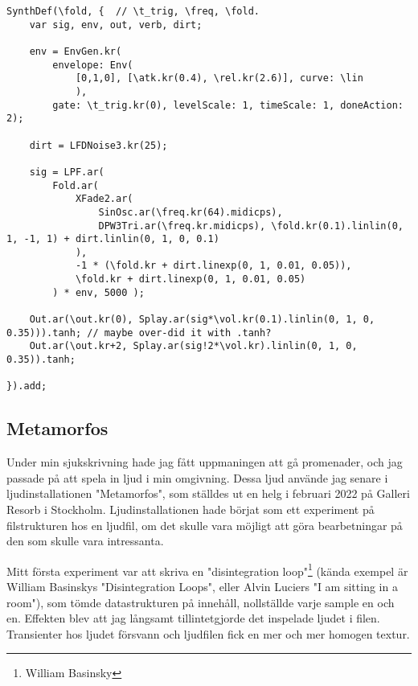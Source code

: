 \documentclass{article}
\renewcommand{\baselinestretch}{1.5}
\begin{document}
\renewcommand{\baselinestretch}{1}
\begin{lstlisting}[style=SuperCollider-IDE, caption=Fold-synt]
SynthDef(\fold, {  // \t_trig, \freq, \fold.
	var sig, env, out, verb, dirt;

	env = EnvGen.kr(
		envelope: Env(
			[0,1,0], [\atk.kr(0.4), \rel.kr(2.6)], curve: \lin
			), 
		gate: \t_trig.kr(0), levelScale: 1, timeScale: 1, doneAction: 2);

	dirt = LFDNoise3.kr(25);

	sig = LPF.ar( 
		Fold.ar(
			XFade2.ar(
				SinOsc.ar(\freq.kr(64).midicps), 
				DPW3Tri.ar(\freq.kr.midicps), \fold.kr(0.1).linlin(0, 1, -1, 1) + dirt.linlin(0, 1, 0, 0.1)
			),
			-1 * (\fold.kr + dirt.linexp(0, 1, 0.01, 0.05)),
			\fold.kr + dirt.linexp(0, 1, 0.01, 0.05)
		) * env, 5000 );

	Out.ar(\out.kr(0), Splay.ar(sig*\vol.kr(0.1).linlin(0, 1, 0, 0.35))).tanh; // maybe over-did it with .tanh?
	Out.ar(\out.kr+2, Splay.ar(sig!2*\vol.kr).linlin(0, 1, 0, 0.35)).tanh;

}).add;
\end{lstlisting}
\renewcommand{\baselinestretch}{1.5}

  \subsection{Metamorfos}
  Under min sjukskrivning hade jag fått uppmaningen att gå promenader, och jag passade på att spela in ljud i
  min omgivning. Dessa ljud använde jag senare i ljudinstallationen "Metamorfos", som ställdes ut en helg i
  februari 2022 på Galleri Resorb i Stockholm. Ljudinstallationen hade börjat som ett experiment på
  filstrukturen hos en ljudfil, om det skulle vara möjligt att göra bearbetningar på den som skulle vara
  intressanta. 

  Mitt första experiment var att skriva en "disintegration loop"\footnote{William Basinsky} (kända
  exempel är William Basinskys "Disintegration Loops", eller Alvin Luciers "I am sitting in a room"), som
  tömde datastrukturen på innehåll, nollställde varje sample en och en. Effekten blev att jag långsamt
  tillintetgjorde det inspelade ljudet i filen. Transienter hos ljudet försvann och ljudfilen fick en mer och
  mer homogen textur.
\end{document}
